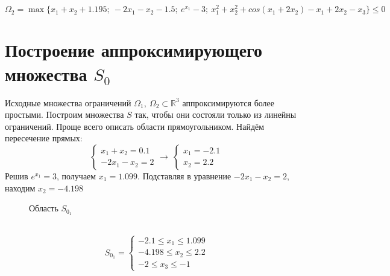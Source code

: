 \documentclass{article}
\begin{document}
\begin{equation*}
    \Omega_2 = \max \{ 
     x_1+x_2+1.195;~
    -2x_1-x_2 - 1.5;~
    e^{x_1} - 3 ;~
    x_1^{2}+x_2^{2}+cos(x_1+2x_2)-x_1+2x_2-x_3\} \le 0
\end{equation*}

\section{Построение аппроксимирующего множества $S_0$}
\noindent Исходные множества ограничений $\Omega_1,~\Omega_2 \subset \mathbb R^{3}$ аппроксимируются более простыми. Построим множества $S$ так, чтобы они состояли только из линейны ограничений.
Проще всего описать области прямоугольником. 
Найдём пересечение прямых:
\begin{equation*}
    \begin{cases}
    x_1+x_2=0.1\\
    -2x_1-x_2=2
    \end{cases}
    \rightarrow ~
    \begin{cases}
    x_1=-2.1\\
    x_2=2.2
    \end{cases}
\end{equation*}
Решив $e^{x_1}=3$, получаем $x_1=1.099$. Подставляя в уравнение $-2x_1-x_2=2$, находим $x_2=-4.198$
\begin{figure}[H]
\label{fig:image}
\caption{Область $S_{0_{1}}$}
\end{figure}
\\
\begin{equation*}
    S_{0_{1}}=
    \begin{cases}
    -2.1\le x_1 \le 1.099\\
    -4.198 \le x_2 \le 2.2\\
    -2 \le x_3 \le -1
    \end{cases}
\end{equation*}
 
\end{document}

